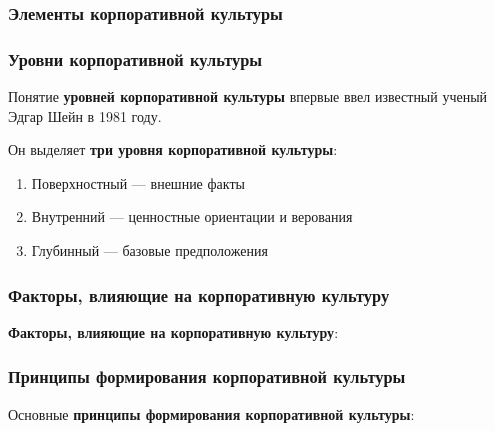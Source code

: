 \subsubsection{Элементы корпоративной культуры}

\begin{multienumerate}
\end{multienumerate}

\subsubsection{Уровни корпоративной культуры}

Понятие \textbf{уровней корпоративной культуры} впервые ввел известный ученый Эдгар Шейн в 1981 году.

Он выделяет \textbf{три уровня корпоративной культуры}:

\begin{enumerate}
    \item Поверхностный — внешние факты
    \item Внутренний — ценностные ориентации и верования
    \item Глубинный — базовые предположения
\end{enumerate}

\subsubsection{Факторы, влияющие на корпоративную культуру}

\textbf{Факторы, влияющие на корпоративную культуру}:

\begin{multienumerate}
\end{multienumerate}

\subsubsection{Принципы формирования корпоративной культуры}

Основные \textbf{принципы формирования корпоративной культуры}:

\begin{multienumerate}
\end{multienumerate}

